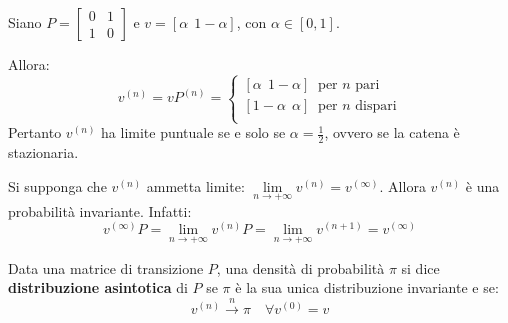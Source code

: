 \begin{ese}
	Siano $P=\left[\begin{smallmatrix}0 & 1 \\ 1 & 0\end{smallmatrix}\right]$ e $v = [\alpha \ \ 1-\alpha]$, con $\alpha \in [0,1]$.
	\begin{figure}[H]
		\centering
	\end{figure}
	Allora:
	$$ v^{(n)} = v P^{(n)} = \begin{cases}
	[\alpha \ \ 1-\alpha] \ \text{ per $n$ pari} \\
	[1-\alpha \ \ \alpha] \ \text{ per $n$ dispari} \\
	\end{cases}$$
	Pertanto $v^{(n)}$ ha limite puntuale se e solo se $\alpha = \frac 1 2$, ovvero se la catena è stazionaria.
\end{ese}
\begin{oss}
	Si supponga che $v^{(n)}$ ammetta limite: $\lim\limits_{n \to +\infty} v^{(n)} = v^{(\infty)}$.
	Allora $v^{(n)}$ è una probabilità invariante. Infatti:
	$$v^{(\infty)} P = \lim\limits_{n \to +\infty} v^{(n)} P = \lim\limits_{n \to +\infty} v^{(n+1)} = v^{(\infty)}$$
\end{oss}
\begin{defn}\label{def-asint-mark}
	Data una matrice di transizione $P$, una densità di probabilità $\pi$ si dice \textbf{distribuzione asintotica}
	di $P$ se $\pi$ è la sua unica distribuzione invariante e se:\\[-0pt]
	$$v^{(n)} \xrightarrow{n} \pi \quad \forall v^{(0)} = v$$
\end{defn}

